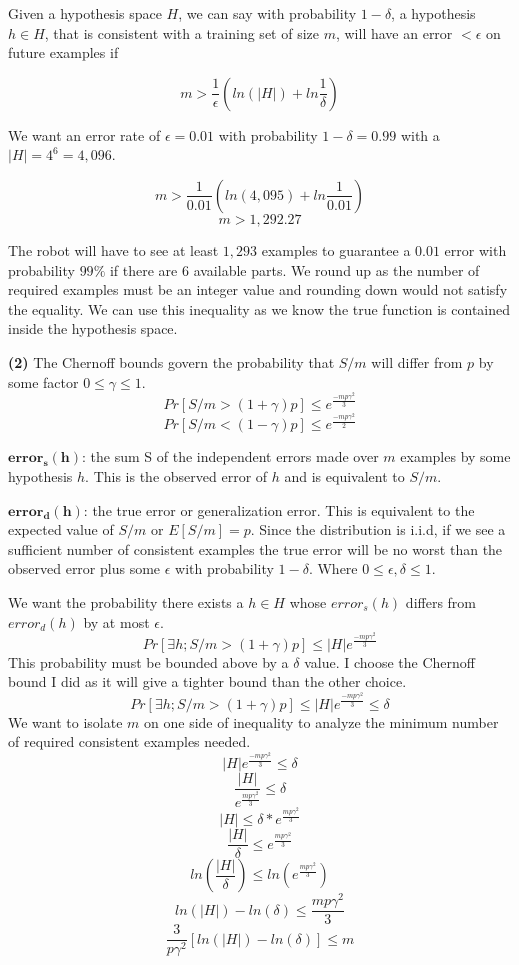 \documentclass[11pt]{article}
\renewcommand\part[1]{\vspace{.10in}\textbf{(#1)}}
\begin{document}
Given a hypothesis space $H$, we can say with probability $1 - \delta$, a hypothesis $h \in H$, that is consistent with a training set of size $m$, will have an error $< \epsilon$ on future examples if

$$m > \frac{1}{\epsilon}(ln(|H|) + ln\frac{1}{\delta})$$

We want an error rate of $\epsilon = 0.01$ with probability $1 - \delta = 0.99$ with a $|H| = 4^6 = 4,096$.

$$m > \frac{1}{0.01}(ln(4,095) + ln\frac{1}{0.01})$$
$$m > 1,292.27$$

The robot will have to see at least $1,293$ examples to guarantee a $0.01$ error with probability $99\%$ if there are 6 available parts. We round up as the number of required examples must be an integer value and rounding down would not satisfy the equality. We can use this inequality as we know the true function is contained inside the hypothesis space.

\newpage
\part{2} The Chernoff bounds govern the probability that $S/m$ will differ from $p$ by some factor $0 \leq \gamma \leq 1$.
	$$Pr[S/m > (1 + \gamma)p] \leq e^\frac{-mp\gamma^2}{3}$$	
	$$Pr[S/m < (1 - \gamma)p] \leq e^\frac{-mp\gamma^2}{2}$$	
	
$\mathbf{error_s(h)}$: the sum S of the independent errors made over $m$ examples by some hypothesis $h$. This is the observed error of $h$ and is equivalent to $S/m$.

$\mathbf{error_d(h)}$: the true error or generalization error. This is equivalent to the expected value of $S/m$ or $E[S/m] = p$. Since the distribution is i.i.d, if we see a sufficient number of consistent examples the true error will be no worst than the observed error plus some $\epsilon$ with probability $1 - \delta$. Where $0 \leq \epsilon, \delta \leq 1$.
	
We want the probability there exists a $h \in H$ whose $error_s(h)$ differs from $error_d(h)$ by at most $\epsilon$.
$$Pr[\exists h; S/m > (1 + \gamma)p] \leq |H|e^\frac{-mp\gamma^2}{3}$$
This probability must be bounded above by a $\delta$ value. I choose the Chernoff bound I did as it will give a tighter bound than the other choice.
$$Pr[\exists h; S/m > (1 + \gamma)p] \leq |H|e^\frac{-mp\gamma^2}{3} \leq \delta$$
We want to isolate $m$ on one side of inequality to analyze the minimum number of required consistent examples needed.
$$|H|e^\frac{-mp\gamma^2}{3} \leq \delta$$
$$\frac{|H|}{e^{\frac{mp\gamma^2}{3}}} \leq \delta$$
$$|H| \leq \delta *e^{\frac{mp\gamma^2}{3}}$$
$$\frac{|H|}{\delta} \leq e^{\frac{mp\gamma^2}{3}}$$
$$ln(\frac{|H|}{\delta}) \leq ln(e^{\frac{mp\gamma^2}{3}})$$
$$ln(|H|) - ln(\delta) \leq \frac{mp\gamma^2}{3}$$
$$\frac{3}{p\gamma^2}[ln(|H|) - ln(\delta)] \leq m$$
\end{document}
